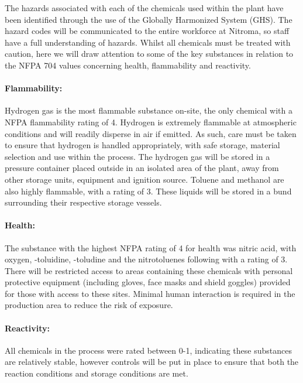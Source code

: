 The hazards associated with each of the chemicals used within the plant have been identified through the use of the Globally Harmonized System (GHS). The hazard codes will be communicated to the entire workforce at Nitroma, so staff have a full understanding of hazards. Whilst all chemicals must be treated with caution, here we will draw attention to some of the key substances in relation to the NFPA 704 values concerning health, flammability and reactivity. 

\paragraph{Flammability:}

Hydrogen gas is the most flammable substance on-site, the only chemical with a NFPA flammability rating of 4.  Hydrogen is extremely flammable at atmospheric conditions and will readily disperse in air if emitted. As such, care must be taken to ensure that hydrogen is handled appropriately, with safe storage, material selection and use within the process. The hydrogen gas will be stored in a pressure container placed outside in an isolated area of the plant, away from other storage units, equipment and ignition source.  Toluene and methanol are also highly flammable, with a rating of 3. These liquids will be stored in a bund surrounding their respective storage vessels. 


\paragraph{Health:}

The substance with the highest NFPA rating of 4 for health was nitric acid, with oxygen, \para-toluidine, \ortho-toludine and the nitrotoluenes  following with a rating of 3. There will be restricted access to areas containing these chemicals with personal protective equipment (including gloves, face masks and shield goggles) provided for those with access to these sites. Minimal human interaction is required in the production area to reduce the risk of exposure.

\paragraph{Reactivity:}

All chemicals in the process were rated between 0-1, indicating these substances are relatively stable, however controls will be put in place to ensure that both the reaction conditions and storage conditions are met. 

